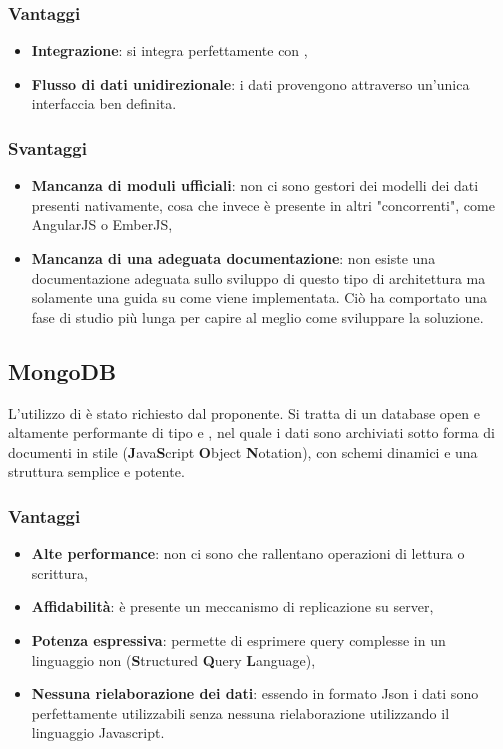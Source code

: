 \subsubsection{Vantaggi}
\begin{itemize}
\item \textbf{Integrazione}: si integra perfettamente con ,
\item \textbf{Flusso di dati unidirezionale}: i dati provengono attraverso un'unica interfaccia ben definita.
\end{itemize}
\subsubsection{Svantaggi}
\begin{itemize}
\item \textbf{Mancanza di moduli ufficiali}: non ci sono gestori dei modelli dei dati presenti nativamente, cosa che invece è presente in altri  "concorrenti", come AngularJS o EmberJS,
\item \textbf{Mancanza di una adeguata documentazione}: non esiste una documentazione adeguata sullo sviluppo di questo tipo di architettura ma solamente una guida su come viene implementata. Ciò ha comportato una fase di studio più lunga per capire al meglio come sviluppare la soluzione.
\end{itemize}

\subsection{MongoDB}
L'utilizzo di  \`e stato richiesto dal proponente. Si tratta di un database  open   e altamente performante di tipo  e , nel quale i dati sono archiviati sotto forma di documenti in stile  (\textbf{J}ava\textbf{S}cript \textbf{O}bject \textbf{N}otation), con schemi dinamici e una struttura semplice e potente.
\subsubsection{Vantaggi}
\begin{itemize}
\item \textbf{Alte performance}: non ci sono  che rallentano operazioni di lettura o scrittura, 
\item \textbf{Affidabilità}: \`e presente un meccanismo di replicazione su server,
\item \textbf{Potenza espressiva}: permette di esprimere query complesse in un linguaggio non  (\textbf{S}tructured \textbf{Q}uery \textbf{L}anguage),
\item \textbf{Nessuna rielaborazione dei dati}: essendo in formato Json i dati sono perfettamente utilizzabili senza nessuna rielaborazione utilizzando il linguaggio Javascript.
\end{itemize}

